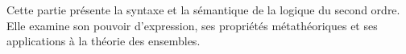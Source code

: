 \documentclass[../../include/open-logic-part]{subfiles}
\begin{document}
\begin{OLPartNotice}{}
Cette partie présente la syntaxe et la sémantique de la logique du
second ordre. Elle examine son pouvoir d'expression, ses propriétés
métathéoriques et ses applications à la théorie des ensembles.
\end{OLPartNotice}




\OLEndPartHook
\end{document}
